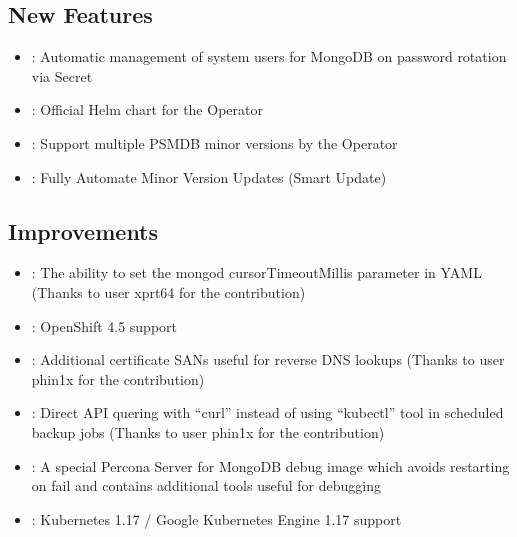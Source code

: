 \documentclass[letterpaper,10pt,english]{sphinxmanual}
\begin{document}
\subsection{New Features}
\label{\detokenize{RN/Kubernetes-Operator-for-PSMONGODB-RN1.5.0:new-features}}\begin{itemize}
\item {} 
: Automatic management of system users for MongoDB on password rotation via Secret

\item {} 
: Official Helm chart for the Operator

\item {} 
: Support multiple PSMDB minor versions by the Operator

\item {} 
: Fully Automate Minor Version Updates (Smart Update)

\end{itemize}


\subsection{Improvements}
\label{\detokenize{RN/Kubernetes-Operator-for-PSMONGODB-RN1.5.0:improvements}}\begin{itemize}
\item {} 
: The ability to set the mongod cursorTimeoutMillis parameter in YAML (Thanks to user xprt64 for the contribution)

\item {} 
: OpenShift 4.5 support

\item {} 
: Additional certificate SANs useful for reverse DNS lookups (Thanks to user phin1x for the contribution)

\item {} 
: Direct API quering with “curl” instead of using “kubectl” tool in scheduled backup jobs (Thanks to user phin1x for the contribution)

\item {} 
: A special Percona Server for MongoDB debug image which avoids restarting on fail and contains additional tools useful for debugging

\item {} 
: Kubernetes 1.17 / Google Kubernetes Engine 1.17 support

\end{itemize}
\end{document}
